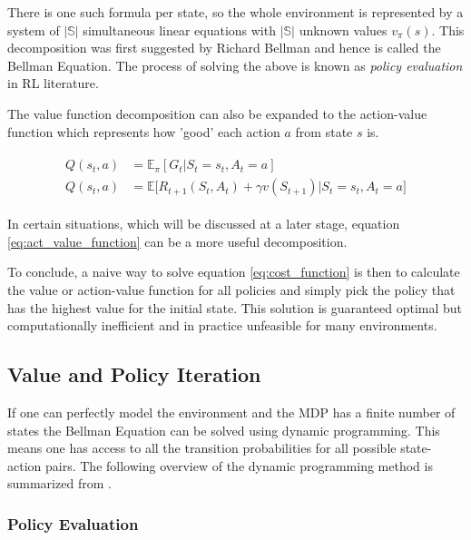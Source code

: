 There is one such formula per state, so the whole environment is represented by a system of $|\mathbb{S}|$ simultaneous linear equations with $|\mathbb{S}|$ unknown values $v_\pi(s)$. This decomposition was first suggested by Richard Bellman\citep{bellman_1957} and hence is called the Bellman Equation. The process of solving the above is known as \textit{policy evaluation} in RL literature.

The value function decomposition can also be expanded to the action-value function which represents how 'good' each action $a$ from state $s$ is.

\begin{align}
\begin{split}
    \label{eq:act_value_function} 
    Q(s_t, a) &=  \mathbb{E}_\pi[G_t|S_t=s_t, A_t=a] \\
    Q(s_t, a) &= \mathbb{E}\big[R_{t+1}(S_t, A_t) + \gamma v(S_{t+1})|S_t=s_t, A_t = a\big]
\end{split}
\end{align}

In certain situations, which will be discussed at a later stage, equation \ref{eq:act_value_function} can be a more useful decomposition.

To conclude, a naive way to solve equation \ref{eq:cost_function} is then to calculate the value or action-value function for all policies and simply pick the policy that has the highest value for the initial state. This solution is guaranteed optimal but computationally inefficient and in practice unfeasible for many environments.

\citep[p.~58-61]{powell_2011}\citep[p.~59]{sutton_barto_2018}

\subsection{Value and Policy Iteration}

If one can perfectly model the environment and the MDP has a finite number of states the Bellman Equation can be solved using dynamic programming. This means one has access to all the transition probabilities for all possible state-action pairs. The following overview of the dynamic programming method is summarized from \cite[p.~74-84]{sutton_barto_2018}.

\subsubsection{Policy Evaluation}

